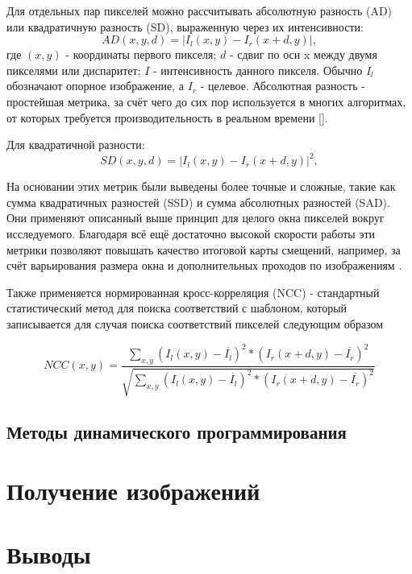 Для отдельных пар пикселей можно рассчитывать абсолютную разность (AD) или квадратичную разность (SD), выраженную через их интенсивности:
\begin{equation}
	AD(x, y, d) = |I_l(x,y) - I_r(x+d, y)|,			
	\label{eq:AD}
\end{equation}
где $(x, y)$ - координаты первого пикселя; $d$ - сдвиг по оси x между двумя пикселями или диспаритет; $I$ - интенсивность данного пикселя. Обычно $I_l$ обозначают опорное изображение, а $I_r$ - 
целевое. Абсолютная разность - простейшая метрика, за счёт чего до сих пор используется в многих алгоритмах, от которых требуется производительность в реальном времени []. 

Для квадратичной разности: 
\begin{equation}
	SD(x, y, d) = |I_l(x,y) - I_r(x+d, y)|^2,		
	\label{eq:SD}
\end{equation}

На основании этих метрик были выведены более точные и сложные, такие как сумма квадратичных разностей (SSD) и сумма абсолютных разностей (SAD). Они применяют описанный выше принцип для целого 
окна пикселей вокруг исследуемого. Благодаря всё ещё достаточно высокой скорости работы эти метрики позволяют повышать качество итоговой карты смещений, например, за счёт варьирования размера окна и 
дополнительных проходов по изображениям \cite{}. 

Также применяется нормированная кросс-корреляция (NCC) - стандартный статистический метод для поиска соответствий с шаблоном, который записывается для случая поиска соответствий пикселей следующим образом 

\begin{equation}
	NCC(x, y) = \frac{ \sum_{x, y}^{} (I_l(x, y) - \overline{I_l} )^2 * ( I_r(x + d, y) - \overline{I_r} )^2   }{ \sqrt{ \sum_{x, y}^{} (I_l(x, y) - \overline{I_l} )^2 * ( I_r(x + d, y) - \overline{I_r} )^2 }  } 
	\label{equ:NCC}
\end{equation}


\subsection{Методы динамического программирования}



\section{Получение изображений}


\section{Выводы}

\newpage





